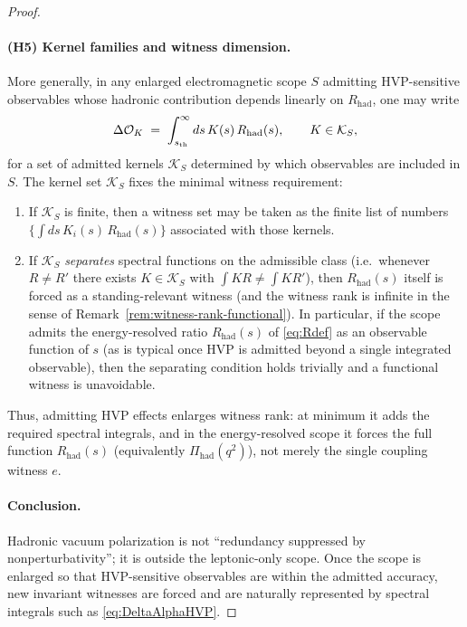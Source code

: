 \documentclass[11pt]{article}
\theoremstyle{remark}
\begin{document}
\begin{proof}
\paragraph{(H5) Kernel families and witness dimension.}
More generally, in any enlarged electromagnetic scope $S$ admitting HVP-sensitive observables whose hadronic contribution depends linearly on $R_{\mathrm{had}}$, one may write
\begin{equation}\label{eq:kernel-functional}
\Delta \mathcal{O}_K \;=\;\int_{s_{\rm th}}^{\infty} ds\,K(s)\,R_{\mathrm{had}}(s),\qquad K\in\mathcal{K}_S,
\end{equation}
for a set of admitted kernels $\mathcal{K}_S$ determined by which observables are included in $S$.
The kernel set $\mathcal{K}_S$ fixes the minimal witness requirement:
\begin{enumerate}[label=(\roman*),leftmargin=2.2em]
\item If $\mathcal{K}_S$ is finite, then a witness set may be taken as the finite list of numbers
$\big\{\int ds\,K_i(s)\,R_{\mathrm{had}}(s)\big\}$ associated with those kernels.
\item If $\mathcal{K}_S$ \emph{separates} spectral functions on the admissible class (i.e.\ whenever
$R\neq R'$ there exists $K\in\mathcal{K}_S$ with $\int K R\neq \int K R'$), then $R_{\mathrm{had}}(s)$ itself is forced as a standing-relevant witness (and the witness rank is infinite in the sense of Remark~\ref{rem:witness-rank-functional}).
In particular, if the scope admits the energy-resolved ratio $R_{\mathrm{had}}(s)$ of \eqref{eq:Rdef} as an observable function of $s$ (as is typical once HVP is admitted beyond a single integrated observable), then the separating condition holds trivially and a functional witness is unavoidable.
\end{enumerate}
Thus, admitting HVP effects enlarges witness rank: at minimum it adds the required spectral integrals, and in the energy-resolved scope it forces the full function $R_{\mathrm{had}}(s)$ (equivalently $\Pi_{\mathrm{had}}(q^2)$), not merely the single coupling witness $e$.

\paragraph{Conclusion.}
Hadronic vacuum polarization is not ``redundancy suppressed by nonperturbativity''; it is outside the leptonic-only scope.
Once the scope is enlarged so that HVP-sensitive observables are within the admitted accuracy, new invariant witnesses are forced and are naturally represented by spectral integrals such as \eqref{eq:DeltaAlphaHVP}.
\end{proof}
\end{document}

